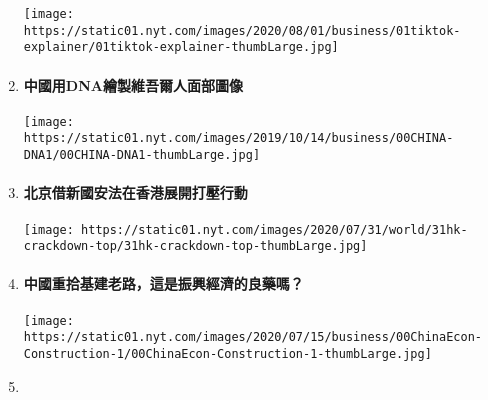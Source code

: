 \begin{enumerate}
  \texttt{[image: https://static01.nyt.com/images/2020/08/01/business/01tiktok-explainer/01tiktok-explainer-thumbLarge.jpg]}
\item
  \href{https://cn.nytimes.com/business/20191203/china-dna-uighurs-xinjiang/zh-hant/?utm_source=top10-in-article\&utm_medium=articlepage\&utm_campaign=web}{}

  \hypertarget{ux4e2dux570bux7528dnaux7e6aux88fdux7dadux543eux723eux4ebaux9762ux90e8ux5716ux50cf}{%
  \paragraph{中國用DNA繪製維吾爾人面部圖像}\label{ux4e2dux570bux7528dnaux7e6aux88fdux7dadux543eux723eux4ebaux9762ux90e8ux5716ux50cf}}

  \texttt{[image: https://static01.nyt.com/images/2019/10/14/business/00CHINA-DNA1/00CHINA-DNA1-thumbLarge.jpg]}
\item
  \href{https://cn.nytimes.com/china/20200803/hong-kong-election-national-security-law/zh-hant/?utm_source=top10-in-article\&utm_medium=articlepage\&utm_campaign=web}{}

  \hypertarget{ux5317ux4eacux501fux65b0ux570bux5b89ux6cd5ux5728ux9999ux6e2fux5c55ux958bux6253ux58d3ux884cux52d5}{%
  \paragraph{北京借新國安法在香港展開打壓行動}\label{ux5317ux4eacux501fux65b0ux570bux5b89ux6cd5ux5728ux9999ux6e2fux5c55ux958bux6253ux58d3ux884cux52d5}}

  \texttt{[image: https://static01.nyt.com/images/2020/07/31/world/31hk-crackdown-top/31hk-crackdown-top-thumbLarge.jpg]}
\item
  \href{https://cn.nytimes.com/business/20200730/china-economy-infrastructure/zh-hant/?utm_source=top10-in-article\&utm_medium=articlepage\&utm_campaign=web}{}

  \hypertarget{ux4e2dux570bux91cdux62feux57faux5efaux8001ux8defux9019ux662fux632fux8208ux7d93ux6fdfux7684ux826fux85e5ux55ce}{%
  \paragraph{中國重拾基建老路，這是振興經濟的良藥嗎？}\label{ux4e2dux570bux91cdux62feux57faux5efaux8001ux8defux9019ux662fux632fux8208ux7d93ux6fdfux7684ux826fux85e5ux55ce}}

  \texttt{[image: https://static01.nyt.com/images/2020/07/15/business/00ChinaEcon-Construction-1/00ChinaEcon-Construction-1-thumbLarge.jpg]}
\item
  \href{https://cn.nytimes.com/opinion/20200730/trump-china/zh-hant/?utm_source=top10-in-article\&utm_medium=articlepage\&utm_campaign=web}{}


\end{enumerate}
